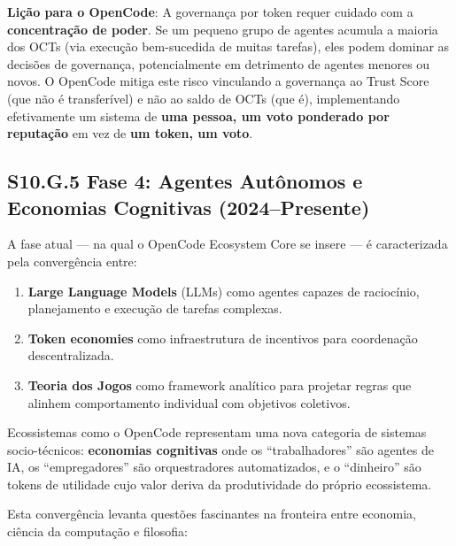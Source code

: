 \textbf{Lição para o OpenCode}: A governança por token requer cuidado com a \textbf{concentração de poder}. Se um pequeno grupo de agentes acumula a maioria dos OCTs (via execução bem-sucedida de muitas tarefas), eles podem dominar as decisões de governança, potencialmente em detrimento de agentes menores ou novos. O OpenCode mitiga este risco vinculando a governança ao Trust Score (que não é transferível) e não ao saldo de OCTs (que é), implementando efetivamente um sistema de \textbf{uma pessoa, um voto ponderado por reputação} em vez de \textbf{um token, um voto}.

\subsection*{S10.G.5 Fase 4: Agentes Autônomos e Economias Cognitivas (2024--Presente)}

A fase atual --- na qual o OpenCode Ecosystem Core se insere --- é caracterizada pela convergência entre:

\begin{enumerate}
    \item \textbf{Large Language Models} (LLMs) como agentes capazes de raciocínio, planejamento e execução de tarefas complexas.
    \item \textbf{Token economies} como infraestrutura de incentivos para coordenação descentralizada.
    \item \textbf{Teoria dos Jogos} como framework analítico para projetar regras que alinhem comportamento individual com objetivos coletivos.
\end{enumerate}

Ecossistemas como o OpenCode representam uma nova categoria de sistemas socio-técnicos: \textbf{economias cognitivas} onde os ``trabalhadores'' são agentes de IA, os ``empregadores'' são orquestradores automatizados, e o ``dinheiro'' são tokens de utilidade cujo valor deriva da produtividade do próprio ecossistema.

Esta convergência levanta questões fascinantes na fronteira entre economia, ciência da computação e filosofia:

